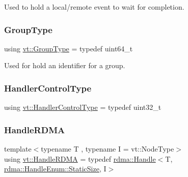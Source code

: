 Used to hold a local/remote event to wait for completion. 

\mbox{\label{namespacevt_a27b5e4411c9b6140c49100e050e2f743}} 
\subsubsection{\texorpdfstring{Group\+Type}{GroupType}}
{\footnotesize\ttfamily using \hyperlink{namespacevt_a27b5e4411c9b6140c49100e050e2f743}{vt\+::\+Group\+Type} = typedef uint64\+\_\+t}



Used for hold an identifier for a group. 

\mbox{\label{namespacevt_adbbef13b92f0a93b14c219b7cc8a48f2}} 
\subsubsection{\texorpdfstring{Handler\+Control\+Type}{HandlerControlType}}
{\footnotesize\ttfamily using \hyperlink{namespacevt_adbbef13b92f0a93b14c219b7cc8a48f2}{vt\+::\+Handler\+Control\+Type} = typedef uint32\+\_\+t}

\mbox{\label{namespacevt_abc3449a4b87363b942453d0b8cc18a7d}} 
\subsubsection{\texorpdfstring{Handle\+R\+D\+MA}{HandleRDMA}}
{\footnotesize\ttfamily template$<$typename T , typename I  = vt\+::\+Node\+Type$>$ \\
using \hyperlink{namespacevt_abc3449a4b87363b942453d0b8cc18a7d}{vt\+::\+Handle\+R\+D\+MA} = typedef \hyperlink{structvt_1_1rdma_1_1_handle}{rdma\+::\+Handle}$<$T, \hyperlink{namespacevt_1_1rdma_a0234ff19cfb3c04718cfdfd36b2d6d88a0c5c41d6a0319a61d3a5e8a060b7c4d7}{rdma\+::\+Handle\+Enum\+::\+Static\+Size}, I$>$}

\mbox{\label{namespacevt_a59ae068fe828d1c33051ff96f3d016b6}} 
